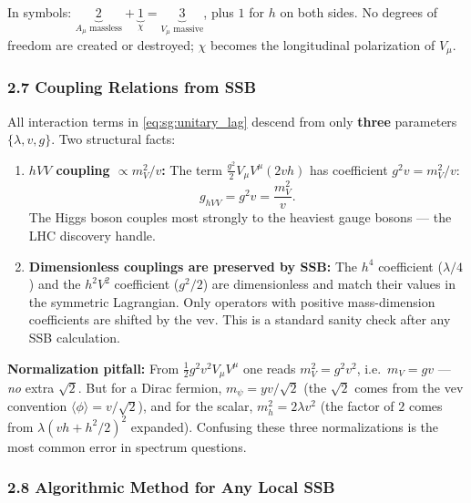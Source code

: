 \documentclass[12pt,a4paper]{article}
\newcommand{\nt}[1]{\begin{note}#1\end{note}}
\begin{document}
In symbols: $\underbrace{2}_{A_\mu\text{ massless}} + \underbrace{1}_{\chi} = \underbrace{3}_{V_\mu\text{ massive}}$, plus $1$ for $h$ on both sides. No degrees of freedom are created or destroyed; $\chi$ becomes the longitudinal polarization of $V_\mu$.

\subsubsection*{2.7 \quad Coupling Relations from SSB}

All interaction terms in \eqref{eq:sg:unitary_lag} descend from only \textbf{three} parameters $\{\lambda, v, g\}$. Two structural facts:

\begin{enumerate}
  \item \textbf{$hVV$ coupling $\propto m_V^2/v$:}
  The term $\tfrac{g^2}{2}V_\mu V^\mu(2vh)$ has coefficient $g^2 v = m_V^2/v$:
  \begin{equation}
    g_{hVV} = g^2 v = \frac{m_V^2}{v} .
    \label{eq:sg:hVV}
  \end{equation}
  The Higgs boson couples most strongly to the heaviest gauge bosons — the LHC discovery handle.

  \item \textbf{Dimensionless couplings are preserved by SSB:}
  The $h^4$ coefficient ($\lambda/4$) and the $h^2V^2$ coefficient ($g^2/2$) are dimensionless and match their values in the symmetric Lagrangian. Only operators with positive mass-dimension coefficients are shifted by the vev. This is a standard sanity check after any SSB calculation.
\end{enumerate}

\nt{\textbf{Normalization pitfall:} From $\tfrac{1}{2}g^2v^2 V_\mu V^\mu$ one reads $m_V^2 = g^2v^2$, i.e.\ $m_V = gv$ — \emph{no} extra $\sqrt{2}$. But for a Dirac fermion, $m_\psi = yv/\sqrt{2}$ (the $\sqrt{2}$ comes from the vev convention $\langle\phi\rangle = v/\sqrt{2}$), and for the scalar, $m_h^2 = 2\lambda v^2$ (the factor of $2$ comes from $\lambda(vh + h^2/2)^2$ expanded). Confusing these three normalizations is the most common error in spectrum questions.}

\subsubsection*{2.8 \quad Algorithmic Method for Any Local SSB}
\end{document}
